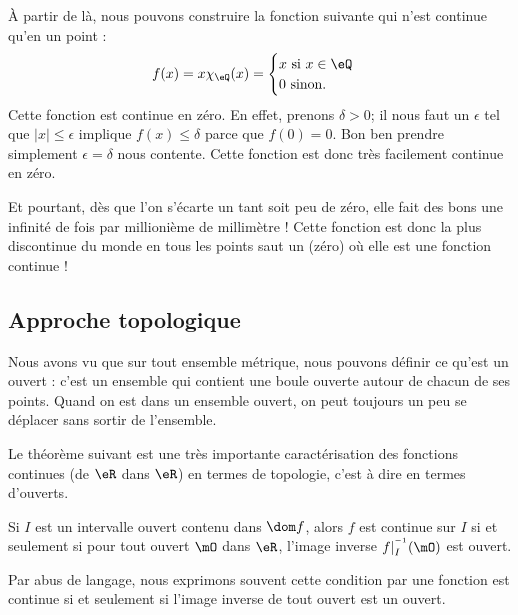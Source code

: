 À partir de là, nous pouvons construire la fonction suivante qui n'est continue qu'en un point :
\[ 
  f(x)=x\chi_{\eQ}(x)=
\begin{cases}
x\text{ si }x\in\eQ\\
0\text{ sinon.}
\end{cases}
\]
Cette fonction est continue en zéro. En effet, prenons $\delta>0$; il nous faut un $\epsilon$ tel que $| x |\leq\epsilon$ implique $f(x)\leq \delta$ parce que $f(0)=0$. Bon ben prendre simplement $\epsilon=\delta$ nous contente. Cette fonction est donc très facilement continue en zéro.

Et pourtant, dès que l'on s'écarte un tant soit peu de zéro, elle fait des bons une infinité de fois par millionième de millimètre ! Cette fonction est donc la plus discontinue du monde en tous les points saut un (zéro) où elle est une fonction continue !

\subsection{Approche topologique}

Nous avons vu que sur tout ensemble métrique, nous pouvons définir ce qu'est un ouvert : c'est un ensemble qui contient une boule ouverte autour de chacun de ses points. Quand on est dans un ensemble ouvert, on peut toujours un peu se déplacer sans sortir de l'ensemble.

Le théorème suivant est une très importante caractérisation des fonctions continues (de $\eR$ dans $\eR$) en termes de topologie, c'est à dire en termes d'ouverts.

\begin{theorem}     \label{ThoContInvOuvert}
Si $I$ est un intervalle ouvert contenu dans $\dom f$, alors $f$ est continue sur $I$ si et seulement si pour tout ouvert $\mO$ dans $\eR$, l'image inverse $f|_I^{^{-1}}(\mO)$ est ouvert.
\end{theorem}

Par abus de langage, nous exprimons souvent cette condition par \og une fonction est continue si et seulement si l'image inverse de tout ouvert est un ouvert\fg.

